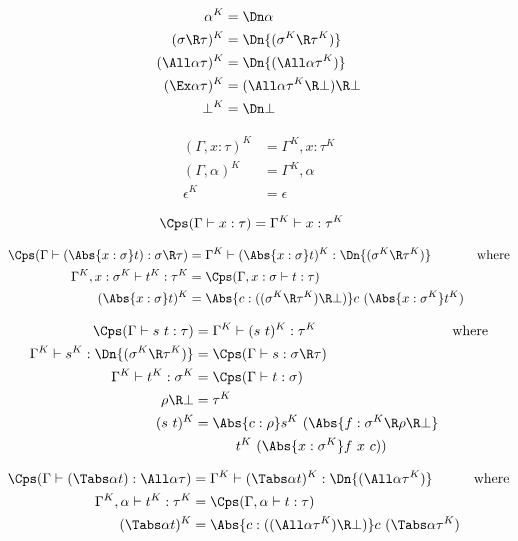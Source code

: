 \documentclass{amsart}
\begin{document}
\def\INDENT{\hspace{3em}}

\begin{align*}
\alpha^K & =
  \Dn\alpha
  \\
(\sigma \R \tau)^K & =
  \Dn{(\sigma^K \R \tau^K)}
  \\
(\All\alpha\tau)^K & =
  \Dn{(\All\alpha\tau^K)}
  \\
(\Ex\alpha\tau)^K & =
  (\All\alpha \tau^K \R \bot) \R \bot
  \\
\bot^K & =
  \Dn\bot
\end{align*}

\begin{align*}
(\Gamma, x:\tau)^K & =
  \Gamma^K, x:\tau^K
  \\
(\Gamma, \alpha)^K & =
  \Gamma^K, \alpha
  \\
\epsilon^K & =
  \epsilon
\end{align*}

\begin{align*}
\Cps(\Gamma \vdash x : \tau) & =
  \Gamma^K \vdash x : \tau^K
\end{align*}

\begin{align*}
\Cps(\Gamma \vdash (\Abs{x:\sigma}t) : \sigma \R \tau) & =
  \Gamma^K \vdash (\Abs{x:\sigma}t)^K : \Dn{(\sigma^K \R \tau^K)} &
  \mbox{where}
  \\
\Gamma^K,x:\sigma^K \vdash t^K : \tau^K & =
  \Cps(\Gamma,x:\sigma \vdash t : \tau)
  \\
(\Abs{x:\sigma}t)^K & =
  \Abs{c : ((\sigma^K \R \tau^K) \R \bot)}c~(\Abs{x : \sigma^K} t^K)
\end{align*}

\begin{align*}
\Cps(\Gamma \vdash s~t : \tau) & =
  \Gamma^K \vdash (s~t)^K : \tau^K
  & \mbox{where}
  \\
\Gamma^K \vdash s^K : \Dn{(\sigma^K \R \tau^K)} & =
  \Cps(\Gamma \vdash s : \sigma \R \tau)
  \\
\Gamma^K \vdash t^K : \sigma^K & =
  \Cps(\Gamma \vdash t : \sigma)
  \\
\rho \R \bot & = \tau^K
  \\
(s~t)^K & =
  \Abs{c : \rho} s^K~(\Abs{f : \sigma^K \R \rho \R \bot} \\
  &\INDENT t^K~(\Abs{x : \sigma^K} f~x~c))
\end{align*}

\begin{align*}
\Cps(\Gamma \vdash (\Tabs\alpha t) : \All\alpha \tau) & =
  \Gamma^K \vdash (\Tabs\alpha t)^K : \Dn{(\All\alpha \tau^K)}
  & \mbox{where}
  \\
\Gamma^K,\alpha \vdash t^K : \tau^K & =
  \Cps(\Gamma,\alpha \vdash t : \tau)
  \\
(\Tabs\alpha t)^K & =
  \Abs{c : ((\All\alpha \tau^K) \R \bot)}c~(\Tabs\alpha \tau^K)
\end{align*}
\end{document}

